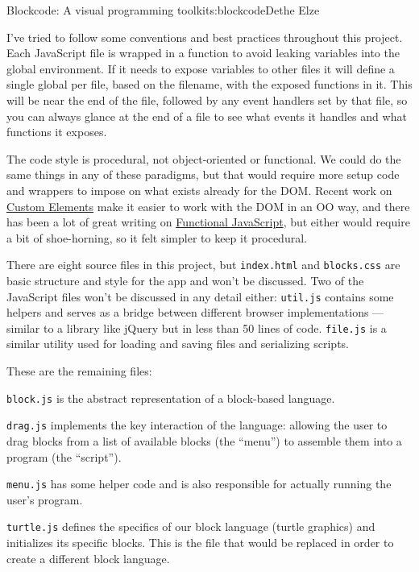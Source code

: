\begin{aosachapter}{Blockcode: A visual programming toolkit}{s:blockcode}{Dethe Elze}
\label{stepping-through-the-code}

I've tried to follow some conventions and best practices throughout this
project. Each JavaScript file is wrapped in a function to avoid leaking
variables into the global environment. If it needs to expose variables
to other files it will define a single global per file, based on the
filename, with the exposed functions in it. This will be near the end of
the file, followed by any event handlers set by that file, so you can
always glance at the end of a file to see what events it handles and
what functions it exposes.

The code style is procedural, not object-oriented or functional. We
could do the same things in any of these paradigms, but that would
require more setup code and wrappers to impose on what exists already
for the DOM. Recent work on \href{http://webcomponents.org/}{Custom
Elements} make it easier to work with the DOM in an OO way, and there
has been a lot of great writing on
\href{https://leanpub.com/javascript-allonge/read}{Functional
JavaScript}, but either would require a bit of shoe-horning, so it felt
simpler to keep it procedural.

There are eight source files in this project, but \texttt{index.html}
and \texttt{blocks.css} are basic structure and style for the app and
won't be discussed. Two of the JavaScript files won't be discussed in
any detail either: \texttt{util.js} contains some helpers and serves as
a bridge between different browser implementations --- similar to a
library like jQuery but in less than 50 lines of code. \texttt{file.js}
is a similar utility used for loading and saving files and serializing
scripts.

These are the remaining files:

\begin{aosaitemize}

\item
  \texttt{block.js} is the abstract representation of a block-based
  language.
\item
  \texttt{drag.js} implements the key interaction of the language:
  allowing the user to drag blocks from a list of available blocks (the
  ``menu'') to assemble them into a program (the ``script'').
\item
  \texttt{menu.js} has some helper code and is also responsible for
  actually running the user's program.
\item
  \texttt{turtle.js} defines the specifics of our block language (turtle
  graphics) and initializes its specific blocks. This is the file that
  would be replaced in order to create a different block language.
\end{aosaitemize}


\end{aosachapter}
